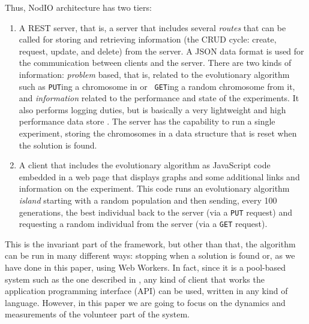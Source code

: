 \documentclass[journal,onecolumn]{IEEEtran}
\begin{document}
Thus, {\sf NodIO} architecture has two tiers:\begin{enumerate}
\item A REST server, that is, a server that includes several {\em
  routes} 
  that can be called for storing and retrieving information (the CRUD cycle:
  create, request, update, and delete) from the server. 
  A JSON data format is used for the communication between 
  clients and the server. There are two kinds of information:
  {\em problem} based, that is, related to the
  evolutionary algorithm such as {\tt PUT}ing a chromosome in or {\tt
  GET}ing a random chromosome from it, and {\em information} related
  to the performance and state of the experiments. It also performs logging
  duties, but is basically a very lightweight and high performance
  data store \cite{jj:idc:lowcost}.
  The server has the capability to
  run a single experiment, storing the chromosomes in a data structure
  that is reset when the solution is found.
\item A client that includes the evolutionary algorithm as
  JavaScript code embedded in a web page that displays graphs and some
  additional links and information on the experiment. This code runs
  an evolutionary algorithm {\em island} starting with a random
  population and then sending, every 100 generations, the best individual
  back to the server (via a {\tt PUT} request) and requesting a random
  individual from the server (via a {\tt GET} request).
\end{enumerate}


  This is the invariant part of the framework, but other than that,
  the algorithm can be run in many different ways: 
  stopping when a solution is found or, as we have done in this paper,
  using Web Workers. In fact, since it is a pool-based system such as
  the one described in \cite{LNCS86720702}, any kind of client that
  works the application programming interface (API) can be used,
  written in any kind of language. However, in this paper we are going
  to focus on the dynamics and measurements of the volunteer part of
  the system. 
\end{document}
